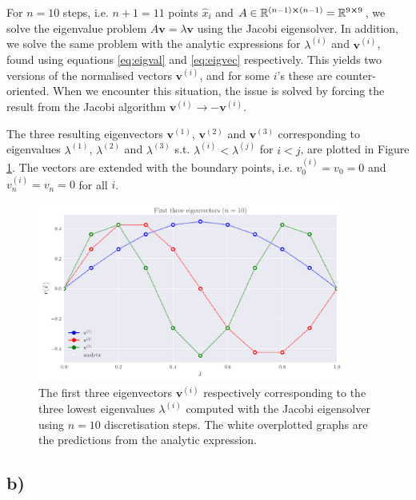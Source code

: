 \documentclass[english,notitlepage,nofootinbib]{revtex4-1}  %
\renewcommand{\vec}{\mathbf}
\begin{document}
For $n=10$ steps, i.e. $n+1=11$ points $\hat{x}_i$ and $A\in\mathbb{R}^{(n-1)\cross(n-1)} =\mathbb{R}^{9\cross 9}$, we solve the eigenvalue problem $A\vec{v} = \lambda \vec{v}$ using the Jacobi eigensolver. In addition, we solve the same problem with the analytic expressions for $\lambda^{(i)}$ and $\vec{v}^{(i)}$, found using equations \ref{eq:eigval} and \ref{eq:eigvec} respectively. This yields two versions of the normalised vectors $\vec{v}^{(i)}$, and for some $i$'s these are counter-oriented. When we encounter this situation, the issue is solved by forcing the result from the Jacobi algorithm $\vec{v}^{(i)} \rightarrow - \vec{v}^{(i)}$.

The three resulting eigenvectors $\vec{v}^{(1)}$, $\vec{v}^{(2)}$ and $\vec{v}^{(3)}$ corresponding to eigenvalues $\lambda^{(1)}$, $\lambda^{(2)}$ and $\lambda^{(3)}$ s.t. $\lambda^{(i)}<\lambda^{(j)}$ for $i<j$, are plotted in Figure \ref{fig:p6_solution_10steps}. The vectors are extended with the boundary points, i.e. $v_0^{(i)}=v_0 = 0$ and $v_n^{(i)}=v_n=0$ for all $i$.


\begin{figure}[h!]
    \centering
    \includegraphics[width=0.9\textwidth]{solution_10steps.pdf}
    \caption{The first three eigenvectors $\vec{v}^{(i)}$ respectively corresponding to the three lowest eigenvalues $\lambda^{(i)}$ computed with the Jacobi eigensolver using $n=10$ discretisation steps. The white overplotted graphs are the predictions from the analytic expression.}\label{fig:p6_solution_10steps}
\end{figure}

\subsection*{b)}
\end{document}
